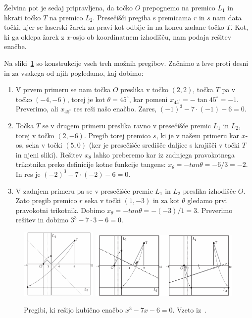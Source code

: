 Želvina pot je sedaj pripravljena, da točko $O$ prepognemo na premico $L_1$ in hkrati točko $T$ na premico $L_2$. Presečišči pregiba s premicama $r$ in $s$ nam data točki, kjer se laserski žarek za pravi kot odbije in na koncu zadane točko $T$. Kot, ki ga oklepa žarek z $x$-osjo ob koordinatnem izhodišču, nam podaja rešitev enačbe.

Na sliki~\ref{fig:lill_primer_pregibi} so konstrukcije vseh treh možnih pregibov. Začnimo z leve proti desni in za vsakega od njih pogledamo, kaj dobimo:
\begin{enumerate}
    \item V prvem primeru se nam točka $O$ preslika v točko $(2,2)$, točka $T$ pa v točko $(-4,-6)$, torej je kot $\theta = 45^\circ$, kar pomeni $x_{45^\circ} = -\tan 45^\circ = -1$. Preverimo, ali $x_{45^\circ}$ res reši našo enačbo. Zares, $(-1)^3 - 7\cdot(-1) - 6 = 0$.
    \item Točka $T$ se v drugem primeru preslika ravno v presečišče premic $L_1$ in $L_2$, torej v točko $(2,-6)$. Pregib torej premico $s$, ki je v našem primeru kar $x$-os, seka v točki $(5,0)$ (ker je presečišče središče daljice s krajišči v točki $T$ in njeni sliki). Rešitev $x_\theta$ lahko preberemo kar iz zadnjega pravokotnega trikotnika preko definicije kotne funkcije tangens: $x_\theta = -tan \theta = -6/3 = -2$. In res je $(-2)^3 - 7\cdot(-2) - 6 = 0$.
    \item V zadnjem primeru pa se v presečišče premic $L_1$ in $L_2$ preslika izhodišče $O$. Zato pregib premico $r$ seka v točki $(1,-3)$ in za kot $\theta$ gledamo prvi pravokotni trikotnik. Dobimo $x_\theta = -tan \theta = -(-3)/1 = 3$. Preverimo rešitev in dobimo $3^3 - 7\cdot3 - 6 = 0$.
\end{enumerate}

\begin{figure}[h]
    \centering
    \includegraphics[width=0.33\textwidth]{images/kubična enačba/lill_primer_pregib1.png}
    \includegraphics[width=0.65\textwidth]{images/kubična enačba/lill_primer_pregib2_3.png}
    \caption[Primer reševanja z Lillovo metodo (s pregibi)]{Pregibi, ki rešijo kubično enačbo $x^3 - 7x - 6 = 0$. Vzeto iz~\cite[str. 91--92]{hull2013}.}
    \label{fig:lill_primer_pregibi}
\end{figure}

